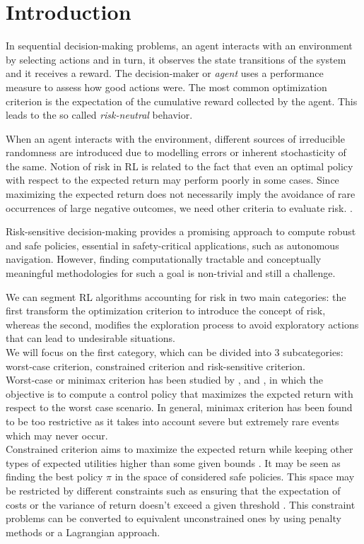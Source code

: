 \chapter{Introduction}
\label{sec:introduction}


In sequential decision-making problems, an agent interacts with an environment by 
selecting actions and in turn, it observes the state transitions of the system and it receives a reward.
The decision-maker or \textit{agent} uses a performance measure to assess how good actions were.
The most common optimization criterion is the expectation of the cumulative reward
collected by the agent. This leads to the so called \textit{risk-neutral} behavior.

When an agent interacts with the environment, different sources of irreducible 
randomness are introduced due to modelling errors or inherent stochasticity of the same.
Notion of risk in RL is related to the fact that even an optimal policy with respect to the 
expected return may perform poorly in some cases.
Since maximizing the expected return does not necessarily imply the avoidance
of rare occurrences of large negative outcomes,
we need other criteria to evaluate risk. \citep{Garcia2015}.

Risk-sensitive decision-making provides a promising
approach to compute robust and safe policies, essential in safety-critical applications,
such as autonomous navigation.
However, finding computationally tractable and conceptually meaningful methodologies for
such a goal is non-trivial and still a challenge.

We can segment RL algorithms accounting for risk in two main categories: the first transform 
the optimization criterion to introduce the concept of risk, whereas the second, modifies
the exploration process to avoid exploratory actions that can lead to undesirable situations.\\
We will focus on the first category, which can be divided into 3 subcategories: worst-case
criterion, constrained criterion and risk-sensitive criterion.\\
Worst-case or minimax criterion has been studied by \citet{Heger1994}, 
\citet{Coraluppi1997} and \citet{Coraluppi1999},
in which the objective is to compute a control policy that maximizes the expcted return
with respect to the worst case scenario. In general, minimax criterion has
been found to be too restrictive as it takes into
account severe but extremely rare events which may never occur.\\
Constrained criterion  aims to maximize the expected return while keeping
other types of expected utilities higher than some given bounds \citep{Altman1993}.
It may be seen as finding the best policy $\pi$ in the space of considered safe policies.
This space may be restricted by different constraints such as ensuring that
the expectation of costs \citep{Geibel2006} or the variance of return doesn't exceed
a given threshold \citep{Tamar2012}.
This constraint problems can be converted to equivalent unconstrained ones by using
penalty methods or a Lagrangian approach.

